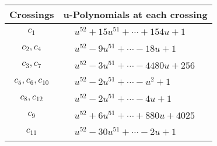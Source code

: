 \documentclass[1p]{elsarticle_modified}
\theoremstyle{definition}
\begin{document}
\begin{tabular}{m{50pt}|m{274pt}}
Crossings & \hspace{64pt}u-Polynomials at each crossing \\
\hline $$\begin{aligned}c_{1}\end{aligned}$$&$\begin{aligned}
&u^{52}+15 u^{51}+\cdots+154 u+1
\end{aligned}$\\
\hline $$\begin{aligned}c_{2},c_{4}\end{aligned}$$&$\begin{aligned}
&u^{52}-9 u^{51}+\cdots-18 u+1
\end{aligned}$\\
\hline $$\begin{aligned}c_{3},c_{7}\end{aligned}$$&$\begin{aligned}
&u^{52}-3 u^{51}+\cdots-4480 u+256
\end{aligned}$\\
\hline $$\begin{aligned}c_{5},c_{6},c_{10}\end{aligned}$$&$\begin{aligned}
&u^{52}-2 u^{51}+\cdots- u^2+1
\end{aligned}$\\
\hline $$\begin{aligned}c_{8},c_{12}\end{aligned}$$&$\begin{aligned}
&u^{52}-2 u^{51}+\cdots-4 u+1
\end{aligned}$\\
\hline $$\begin{aligned}c_{9}\end{aligned}$$&$\begin{aligned}
&u^{52}+6 u^{51}+\cdots+880 u+4025
\end{aligned}$\\
\hline $$\begin{aligned}c_{11}\end{aligned}$$&$\begin{aligned}
&u^{52}-30 u^{51}+\cdots-2 u+1
\end{aligned}$\\
\hline
\end{tabular}\\~\\
\newpage\renewcommand{\arraystretch}{1}
\end{document}
